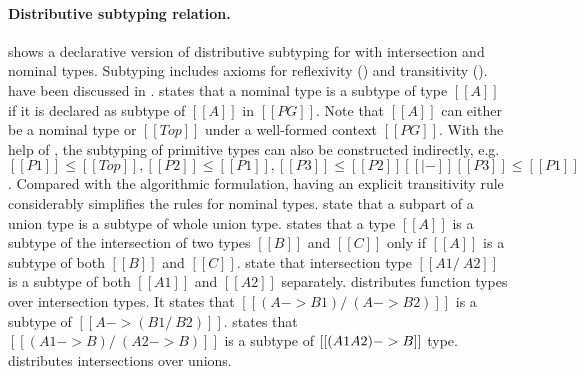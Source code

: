 \paragraph*{Distributive subtyping relation.}
 shows a declarative version of distributive subtyping for
\name with intersection and nominal types.
Subtyping includes
axioms for reflexivity () and
transitivity ().  have been
discussed in .
 states that a nominal type is a subtype of type $[[A]]$ if
it is declared as subtype of $[[A]]$ in $[[PG]]$. Note that $[[A]]$ can either be
a nominal type or $[[Top]]$ under a well-formed context $[[PG]]$.
With the help of , the subtyping of primitive types can also be
constructed indirectly, e.g.
$[[P1]]\leq[[Top]],[[P2]]\leq[[P1]],[[P3]]\leq[[P2]][[|-]][[P3]]\leq[[P1]]$.
Compared with the algorithmic formulation, having an explicit transitivity rule
considerably simplifies the rules for nominal types.
 state that a subpart of a union type is a subtype of whole union type.
 states that a type $[[A]]$ is
a subtype of the intersection of two types $[[B]]$ and $[[C]]$ only if
$[[A]]$ is a subtype of both $[[B]]$ and $[[C]]$.
 state that intersection type $[[A1 /\ A2]]$ is a subtype of both $[[A1]]$
and $[[A2]]$ separately.
 distributes function types over intersection types.
It states that $[[(A -> B1) /\ (A -> B2)]]$ is a subtype of
$[[A -> (B1 /\ B2)]]$.
 states that $[[(A1 -> B) /\ (A2 -> B)]]$ is a subtype of
$[[(A1 \/ A2) -> B]]$ type.
 distributes intersections over unions.

%

